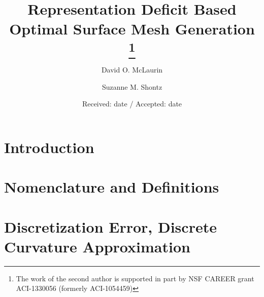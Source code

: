 \documentclass[smallextended]{svjour3}       %
\begin{document}
\title{Representation Deficit Based Optimal Surface Mesh Generation
\thanks{The work of the second author is supported in part by NSF CAREER grant ACI-1330056 (formerly ACI-1054459)}
}

\author{
  David O. McLaurin \and
  Suzanne M. Shontz
}



\date{Received: date / Accepted: date}

\maketitle

\begin{abstract}

\end{abstract}

\section{Introduction}


\section{Nomenclature and Definitions}


\section{Discretization Error, Discrete Curvature Approximation}

\end{document}
